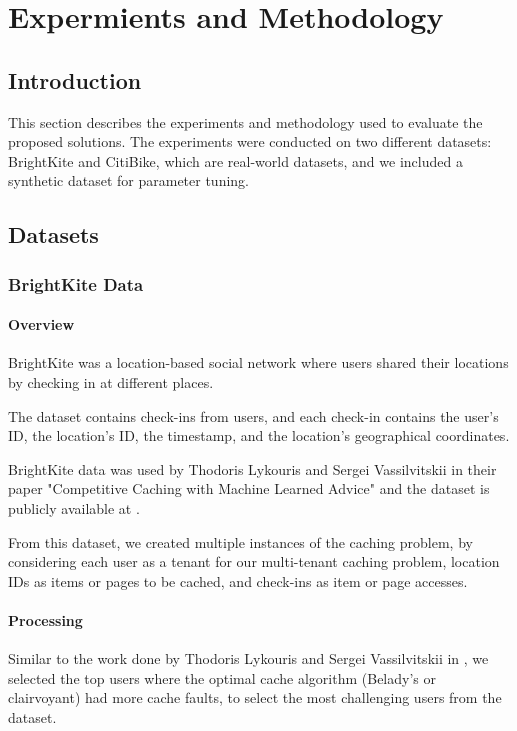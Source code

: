 \chapter{Expermients and Methodology}

\section{Introduction}

This section describes the experiments and methodology used to evaluate the proposed solutions. 
The experiments were conducted on two different datasets: BrightKite and CitiBike, which are 
real-world datasets, and we included a synthetic dataset for parameter tuning.

\section{Datasets}

\subsection{BrightKite Data}

\subsubsection{Overview}

BrightKite was a location-based social network where users shared their locations by checking in at 
different places.

The dataset contains check-ins from users, and each check-in contains the user's ID, the location's ID, 
the timestamp, and the location's geographical coordinates.

BrightKite data was used by Thodoris Lykouris and Sergei Vassilvitskii in their paper "Competitive 
Caching with Machine Learned Advice" \cite{datasets-reference} and the dataset is publicly available
at \cite{brightkite-data}.

From this dataset, we created multiple instances of the caching problem, by considering each user 
as a tenant for our multi-tenant caching problem, location IDs as items or pages to be cached, and 
check-ins as item or page accesses. 

\subsubsection{Processing}

Similar to the work done by Thodoris Lykouris and Sergei Vassilvitskii in \cite{datasets-reference},
we selected the top users where the optimal cache algorithm (Belady's or clairvoyant) had more cache 
faults, to select the most challenging users from the dataset.

